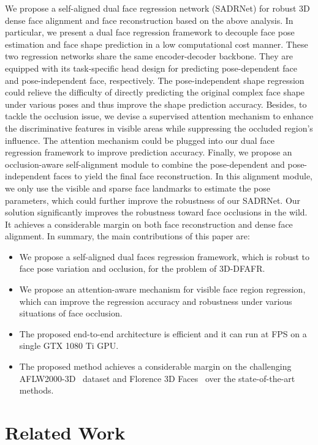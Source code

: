 \documentclass[journal]{IEEEtran}
\begin{document}
	We propose a self-aligned dual face regression network (SADRNet) for robust 3D dense face alignment and face reconstruction based on the above analysis. In particular, we present a dual face regression framework to decouple face pose estimation and face shape prediction in a low computational cost manner. These two regression networks share the same encoder-decoder backbone. They are equipped with its task-specific head design for predicting pose-dependent face and pose-independent face, respectively. The pose-independent shape regression could relieve the difficulty of directly predicting the original complex face shape under various poses and thus improve the shape prediction accuracy. Besides, to tackle the occlusion issue, we devise a supervised attention mechanism to enhance the discriminative features in visible areas while suppressing the occluded region's influence. The attention mechanism could be plugged into our dual face regression framework to improve prediction accuracy. Finally, we propose an occlusion-aware self-alignment module to combine the pose-dependent and pose-independent faces to yield the final face reconstruction. In this alignment module, we only use the visible and sparse face landmarks to estimate the pose parameters, which could further improve the robustness of our SADRNet. Our solution significantly improves the robustness toward face occlusions in the wild. It achieves a considerable margin on both face reconstruction and dense face alignment. In summary, the main contributions of this paper are:
	\begin{itemize}
		\item We propose a self-aligned dual faces regression framework, which is robust to face pose variation and occlusion, for the problem of 3D-DFAFR.
		\item We propose an attention-aware mechanism for visible face region regression, which can improve the regression
		accuracy and robustness under various situations of face occlusion.
		\item The proposed end-to-end architecture is efficient and it can run at  FPS on a single GTX 1080 Ti GPU.
		\item The proposed method achieves a considerable margin on the challenging AFLW2000-3D~\cite{3DDFA} dataset and Florence 3D Faces~\cite{florence} over the state-of-the-art methods.
	\end{itemize}
	
	
	\section{Related Work}
\end{document}
